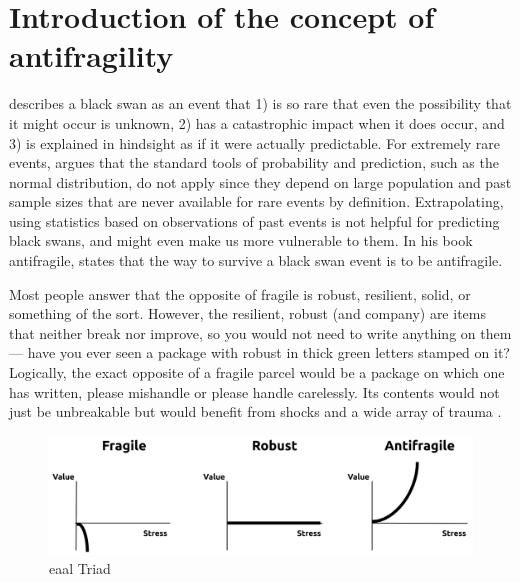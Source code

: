\section{Introduction of the concept of antifragility}
\label{sec:introantifragility}
\textcite{Taleb2008} describes a black swan as an event that 1) is so rare that even the possibility that it might occur is unknown, 2) has a catastrophic impact when it does occur, and 3) is explained in hindsight as if it were actually predictable. For extremely rare events, \citeauthor{Taleb2008} argues that the standard tools of probability and prediction, such as the normal distribution, do not apply since they depend on large population and past sample sizes that are never available for rare events by definition. Extrapolating, using statistics based on observations of past events is not helpful for predicting black swans, and might even make us more vulnerable to them. In his book \Gls{antifragile}, \textcite{Taleb2012} states that the way to survive a black swan event is to be \gls{antifragile}.\par
Most people answer that the opposite of \gls{fragile} is \gls{robust}, \gls{resilient}, solid, or something of the sort. However, the \gls{resilient}, \gls{robust} (and company) are items that neither break nor improve, so you would not need to write anything on them — have you ever seen a package with \gls{robust} in thick green letters stamped on it? Logically, the exact opposite of a \gls{fragile} parcel would be a package on which one has written, please mishandle or please handle carelessly. Its contents would not just be unbreakable but would benefit from shocks and a wide array of trauma \parencite{Taleb2012}.

\begin{figure}[h!]
	\centering
	\includegraphics[width=0.7\linewidth]{images/eaal-triad}
	\caption[EAAL Triad]{\acrshort{eaal} Triad \parencite{Botjes2020}}
	\label{fig:eaal-triad}
\end{figure}

